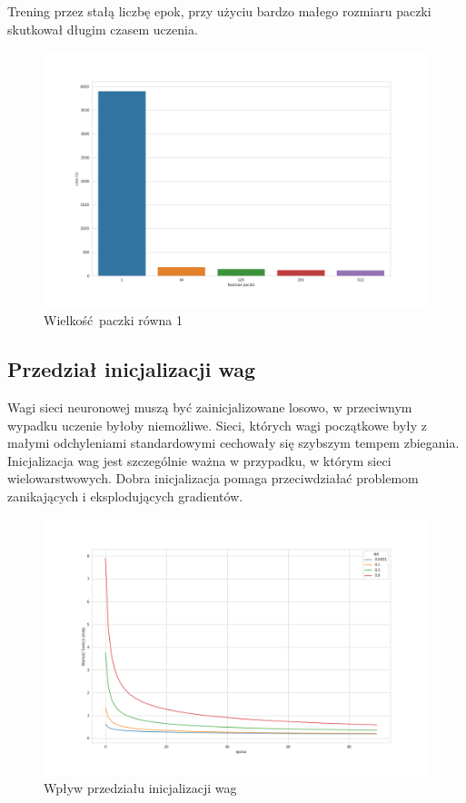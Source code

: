 \documentclass{article}
\begin{document}
Trening przez stałą liczbę epok, przy użyciu bardzo małego rozmiaru paczki skutkował długim czasem uczenia.

\begin{figure}[H]
  \centering
  \includegraphics[width=\textwidth]{images/batch_size_time.png}
  \caption{Wielkość paczki równa 1}
\end{figure}

\subsection{Przedział inicjalizacji wag}
Wagi sieci neuronowej muszą być zainicjalizowane losowo, w przeciwnym wypadku uczenie byłoby niemożliwe.
Sieci, których wagi początkowe były z małymi odchyleniami standardowymi cechowały się szybszym tempem zbiegania.
Inicjalizacja wag jest szczególnie ważna w przypadku, w którym sieci wielowarstwowych.
Dobra inicjalizacja pomaga przeciwdziałać problemom zanikających i eksplodujących gradientów.
\begin{figure}[H]
  \centering
  \includegraphics[width=\textwidth]{images/std_comp.png}
  \caption{Wpływ przedziału inicjalizacji wag}
\end{figure}
\end{document}
